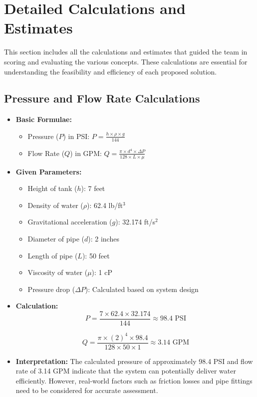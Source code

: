 \documentclass[12pt]{report}
\begin{document}
    \section{Detailed Calculations and Estimates}
    This section includes all the calculations and estimates that guided the team in scoring and evaluating the various concepts. These calculations are essential for understanding the feasibility and efficiency of each proposed solution.

    \subsection{Pressure and Flow Rate Calculations}
    \begin{itemize}
        \item \textbf{Basic Formulae:}
        \begin{itemize}
            \item Pressure (\(P\)) in PSI: \( P = \frac{h \times \rho \times g}{144} \)
            \item Flow Rate (\(Q\)) in GPM: \( Q = \frac{\pi \times d^4 \times \Delta P}{128 \times L \times \mu} \)
        \end{itemize}
        
        \item \textbf{Given Parameters:}
        \begin{itemize}
            \item Height of tank (\(h\)): 7 feet
            \item Density of water (\(\rho\)): 62.4 lb/ft\(^3\)
            \item Gravitational acceleration (\(g\)): 32.174 ft/s\(^2\)
            \item Diameter of pipe (\(d\)): 2 inches
            \item Length of pipe (\(L\)): 50 feet
            \item Viscosity of water (\(\mu\)): 1 cP
            \item Pressure drop (\(\Delta P\)): Calculated based on system design
        \end{itemize}
        
        \item \textbf{Calculation:}
        \[
        P = \frac{7 \times 62.4 \times 32.174}{144} \approx 98.4 \text{ PSI}
        \]
        
        \[
        Q = \frac{\pi \times (2)^4 \times 98.4}{128 \times 50 \times 1} \approx 3.14 \text{ GPM}
        \]
        
        \item \textbf{Interpretation:}
        The calculated pressure of approximately 98.4 PSI and flow rate of 3.14 GPM indicate that the system can potentially deliver water efficiently. However, real-world factors such as friction losses and pipe fittings need to be considered for accurate assessment.
    \end{itemize}
    
\end{document}
